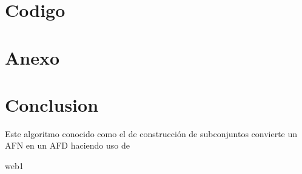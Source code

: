 \documentclass[12pt]{article}
\begin{document}
\section{Codigo}




\begin{figure}[H]%
\centering
\caption*{}

\end{figure}




\section{Anexo}



\begin{figure}[H]%
\centering
\caption*{}

\end{figure}





\newpage
\section{Conclusion}

Este algoritmo conocido como el de construcción de
subconjuntos convierte un AFN en un AFD haciendo uso de



	


\vspace{20 mm}


 web1 \cite{naiouf2010procesamiento}




\printbibliography
\end{document}
